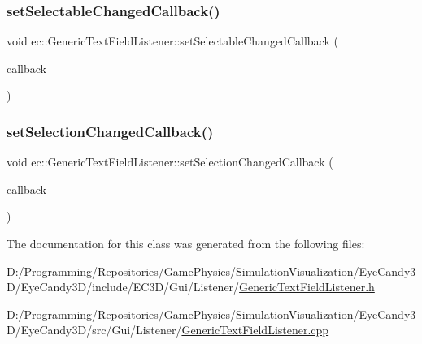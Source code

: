 \subsubsection{\texorpdfstring{set\+Selectable\+Changed\+Callback()}{setSelectableChangedCallback()}}
{\footnotesize\ttfamily void ec\+::\+Generic\+Text\+Field\+Listener\+::set\+Selectable\+Changed\+Callback (\begin{DoxyParamCaption}\item[{const \mbox{\hyperlink{classec_1_1_generic_text_field_listener_afa761f962b7fb681d7d9d29a132f800e}{Selectable\+Changed\+\_\+\+Callback}} \&}]{callback }\end{DoxyParamCaption})}

\mbox{\label{classec_1_1_generic_text_field_listener_aea5a7265627003b41e3a74744a1251d6}} 
\subsubsection{\texorpdfstring{set\+Selection\+Changed\+Callback()}{setSelectionChangedCallback()}}
{\footnotesize\ttfamily void ec\+::\+Generic\+Text\+Field\+Listener\+::set\+Selection\+Changed\+Callback (\begin{DoxyParamCaption}\item[{const \mbox{\hyperlink{classec_1_1_generic_text_field_listener_aa25985c5297422833dc4f5395562f238}{Selection\+Changed\+\_\+\+Callback}} \&}]{callback }\end{DoxyParamCaption})}



The documentation for this class was generated from the following files\+:\begin{DoxyCompactItemize}
\item 
D\+:/\+Programming/\+Repositories/\+Game\+Physics/\+Simulation\+Visualization/\+Eye\+Candy3\+D/\+Eye\+Candy3\+D/include/\+E\+C3\+D/\+Gui/\+Listener/\mbox{\hyperlink{_generic_text_field_listener_8h}{Generic\+Text\+Field\+Listener.\+h}}\item 
D\+:/\+Programming/\+Repositories/\+Game\+Physics/\+Simulation\+Visualization/\+Eye\+Candy3\+D/\+Eye\+Candy3\+D/src/\+Gui/\+Listener/\mbox{\hyperlink{_generic_text_field_listener_8cpp}{Generic\+Text\+Field\+Listener.\+cpp}}\end{DoxyCompactItemize}
